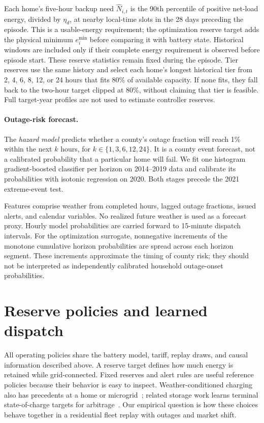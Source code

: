Each home's five-hour backup need $\hat N_{i,t}$ is the 90th percentile of positive net-load energy, divided by $\eta_d$, at nearby local-time slots in the 28 days preceding the episode. This is a usable-energy requirement; the optimization reserve target adds the physical minimum $e_i^{\min}$ before comparing it with battery state. Historical windows are included only if their complete energy requirement is observed before episode start. These reserve statistics remain fixed during the episode. Tier reserves use the same history and select each home's longest historical tier from 2, 4, 6, 8, 12, or 24 hours that fits 80\% of available capacity. If none fits, they fall back to the two-hour target clipped at 80\%, without claiming that tier is feasible. Full target-year profiles are not used to estimate controller reserves.

\paragraph{Outage-risk forecast.}
The \emph{hazard model} predicts whether a county's outage fraction will reach 1\% within the next $k$ hours, for $k\in\{1,3,6,12,24\}$. It is a county event forecast, not a calibrated probability that a particular home will fail. We fit one histogram gradient-boosted classifier per horizon on 2014--2019 data and calibrate its probabilities with isotonic regression on 2020. Both stages precede the 2021 extreme-event test.

Features comprise weather from completed hours, lagged outage fractions, issued alerts, and calendar variables. No realized future weather is used as a forecast proxy. Hourly model probabilities are carried forward to 15-minute dispatch intervals. For the optimization surrogate, nonnegative increments of the monotone cumulative horizon probabilities are spread across each horizon segment. These increments approximate the timing of county risk; they should not be interpreted as independently calibrated household outage-onset probabilities.

\section{Reserve policies and learned dispatch}
\label{sec:controllers}

All operating policies share the battery model, tariff, replay draws, and causal information described above. A reserve target defines how much energy is retained while grid-connected. Fixed reserves and alert rules are useful reference policies because their behavior is easy to inspect. Weather-conditioned charging also has precedents at a home or microgrid~\citep{schmitz2020proactive,gutierrezrojas2021weather}; related storage work learns terminal state-of-charge targets for arbitrage~\citep{tapia2026reachability}. Our empirical question is how these choices behave together in a residential fleet replay with outages and market shift.

